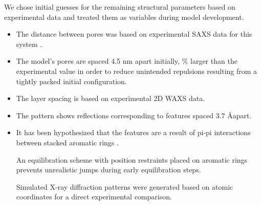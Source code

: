 \documentclass{article}
\newcommand{\angstrom}{\textup{\AA}}
\begin{document}
  We chose initial guesses for the remaining structural parameters based on 
  experimental data and treated them as variables during model development.
  \begin{itemize}
    \item The distance between pores was based on experimental SAXS data for
    this system \cite{feng_thin_2016}.
    \item The model's pores are spaced 4.5 nm apart initially,  \% larger
    than the experimental value in order to reduce unintended repulsions 
    resulting from a tightly packed initial configuration.
    \item The layer spacing is based on experimental 2D WAXS data.
    \item The pattern shows reflections corresponding to features spaced 3.7 \angstrom apart.
    \item It has been hypothesized that the features are a result of pi-pi
    interactions between stacked aromatic rings \cite{feng_scalable_2014}. 

  An equilibration scheme with position restraints placed on aromatic rings
  prevents unrealistic jumps during early equilibration steps.
  
  Simulated X-ray diffraction patterns were generated based on atomic
  coordinates for a direct experimental comparison.
  

\end{itemize}
\end{document}
